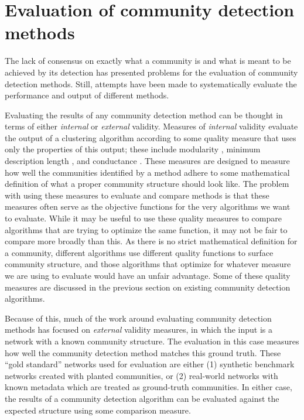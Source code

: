 \hypertarget{evaluation}{\section{Evaluation of community detection
methods}\label{evaluation}}

\protect\hyperlink{evaluation}{}

The lack of consensus on exactly what a community is and what is meant
to be achieved by its detection has presented problems for the
evaluation of community detection methods. Still, attempts have been
made to systematically evaluate the performance and output of different
methods.

Evaluating the results of any community detection method can be thought
in terms of either \emph{internal} or \emph{external} validity. Measures
of \emph{internal} validity evaluate the output of a clustering
algorithm according to some quality measure that uses only the
properties of this output; these include modularity
\autocite{newman_finding_2004}, minimum description length
\autocite{rosvall_map_2010}, and conductance
\autocite{leskovec_empirical_2010}. These measures are designed to
measure how well the communities identified by a method adhere to some
mathematical definition of what a proper community structure should look
like. The problem with using these measures to evaluate and compare
methods is that these measures often serve as the objective functions
for the very algorithms we want to evaluate. While it may be useful to
use these quality measures to compare algorithms that are trying to
optimize the same function, it may not be fair to compare more broadly
than this. As there is no strict mathematical definition for a
community, different algorithms use different quality functions to
surface community structure, and those algorithms that optimize for
whatever measure we are using to evaluate would have an unfair
advantage. Some of these quality measures are discussed in the previous
section on existing community detection algorithms.

Because of this, much of the work around evaluating community detection
methods has focused on \emph{external} validity measures, in which the
input is a network with a known community structure. The evaluation in
this case measures how well the community detection method matches this
ground truth. These ``gold standard'' networks used for evaluation are
either (1) synthetic benchmark networks created with planted
communities, or (2) real-world networks with known metadata which are
treated as ground-truth communities. In either case, the results of a
community detection algorithm can be evaluated against the expected
structure using some comparison measure.

